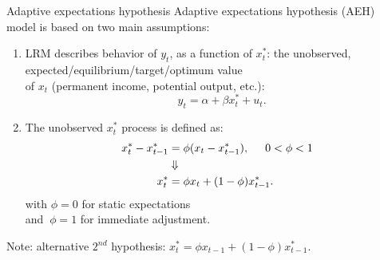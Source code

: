 \documentclass{beamer}
\begin{document}
\begin{frame}{Adaptive expectations hypothesis}
Adaptive expectations hypothesis (AEH) \\ model is based on two main assumptions:
\bigskip
\begin{enumerate}
\item LRM describes behavior of $y_t$, as a function of ${x}_t^\ast$: the unobserved, 
expected/equilibrium/target/optimum value \\of $x_t$ 
(permanent income, potential output, etc.):
\begin{equation}
~~~~y_t = \alpha + \beta x_t^\ast + u_t.\label{eqare1}
\end{equation}
\item The unobserved ${x}_t^\ast$ process is defined as:
\begin{equation} \label{eqare2}
\begin{aligned}
x^\ast_t - x^\ast_{t-1} & = \phi( x_t - x_{t-1}^\ast), \hspace{0.5cm} 0 < \phi < 1\\
 &  \Downarrow \\
x_t^\ast & =  \phi x_t + (1-\phi) x^\ast_{t-1}.
\end{aligned}
\end{equation}
with $\phi=0$ for static expectations\\ and $~\phi=1$ for immediate adjustment.
\end{enumerate}
\footnotesize{Note: alternative $2^{nd}$ hypothesis: $x_t^\ast =  \phi x_{t-1} + (1-\phi) x^\ast_{t-1}. $}
\end{frame}
\end{document}

